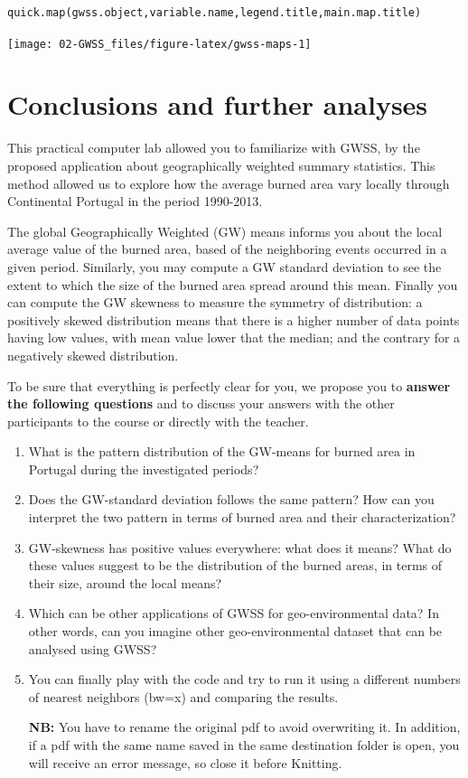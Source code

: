 \documentclass[
]{book}
\theoremstyle{definition}
\theoremstyle{definition}
\theoremstyle{definition}
\theoremstyle{definition}
\theoremstyle{remark}
\begin{document}
\begin{verbatim}
quick.map(gwss.object,variable.name,legend.title,main.map.title)
\end{verbatim}

\begin{center}\texttt{[image: 02-GWSS\_files/figure-latex/gwss-maps-1]} \end{center}

\hypertarget{conclusions-and-further-analyses}{%
\section{Conclusions and further analyses}\label{conclusions-and-further-analyses}}

This practical computer lab allowed you to familiarize with GWSS, by the proposed application about geographically weighted summary statistics.
This method allowed us to explore how the average burned area vary locally through Continental Portugal in the period 1990-2013.

The global Geographically Weighted (GW) means informs you about the local average value of the burned area, based of the neighboring events occurred in a given period.
Similarly, you may compute a GW standard deviation to see the extent to which the size of the burned area spread around this mean.
Finally you can compute the GW skewness to measure the symmetry of distribution: a positively skewed distribution means that there is a higher number of data points having low values, with mean value lower that the median; and the contrary for a negatively skewed distribution.

To be sure that everything is perfectly clear for you, we propose you to \textbf{answer the following questions} and to discuss your answers with the other participants to the course or directly with the teacher.

\begin{enumerate}
\def\labelenumi{\arabic{enumi})}
\item
  What is the pattern distribution of the GW-means for burned area in Portugal during the investigated periods?
\item
  Does the GW-standard deviation follows the same pattern?
  How can you interpret the two pattern in terms of burned area and their characterization?
\item
  GW-skewness has positive values everywhere: what does it means?
  What do these values suggest to be the distribution of the burned areas, in terms of their size, around the local means?
\item
  Which can be other applications of GWSS for geo-environmental data?
  In other words, can you imagine other geo-environmental dataset that can be analysed using GWSS?
\item
  You can finally play with the code and try to run it using a different numbers of nearest neighbors (bw=x) and comparing the results.

  \textbf{NB:} You have to rename the original pdf to avoid overwriting it.
  In addition, if a pdf with the same name saved in the same destination folder is open, you will receive an error message, so close it before Knitting.
\end{enumerate}
\end{document}
